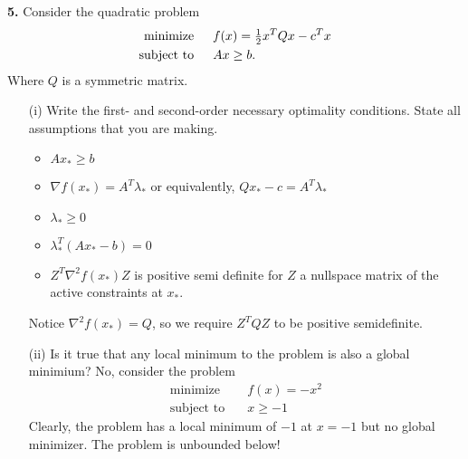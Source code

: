 \documentclass{article}
\begin{document}
\textbf{5.} Consider the quadratic problem
\begin{align*}
    \text{minimize} \hspace{1.5em} &f(x) = \tfrac{1}{2}x^TQx - c^Tx\\
    \text{subject to} \hspace{1.5em} &Ax \geq b.
\end{align*}
Where $Q$ is a symmetric matrix.
\begin{itemize}
    \item[(i)] Write the first- and second-order necessary optimality conditions. State all assumptions that you are making.
    \newline
    \begin{itemize}
        \item $Ax_* \geq b$

        \item $\nabla f(x_*) = A^T\lambda_*$ or equivalently, $Qx_* - c = A^T\lambda_*$

        \item $\lambda_* \geq 0$

        \item $\lambda_*^T (Ax_* - b) = 0$

        \item $Z^T\nabla^2f(x_*)Z$ is positive semi definite for $Z$ a nullspace matrix of the active constraints at $x_*$. 
    \end{itemize}
    Notice $\nabla^2f(x_*) = Q$, so we require $Z^TQZ$ to be positive semidefinite.
    

    \item[(ii)] Is it true that any local minimum to the problem is also a global minimium?
    \newline\newline
    No, consider the problem 
    \begin{align*}
        \text{minimize} \hspace{1em} &f(x) = -x^2\\
        \text{subject to}\hspace{1em} &x \geq -1
    \end{align*}
    Clearly, the problem has a local minimum of $-1$ at $x = -1$ but no global minimizer. The problem is unbounded below!
    
\end{itemize}
\end{document}
